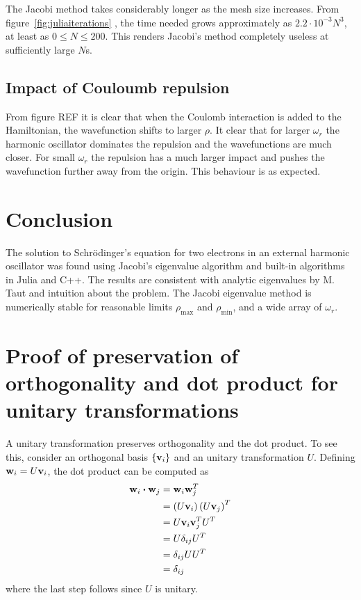 \documentclass[aps,reprint]{revtex4-1}
\newcommand\blankpage{%
  \null
  \thispagestyle{empty}%
  \addtocounter{page}{-1}%
  \newpage}
\begin{document}
The Jacobi method takes considerably longer as the mesh size increases. From
figure~\ref{fig:juliaiterations} , the time needed grows approximately as
\(2.2\cdot 10^{-3}N^{3}\), at least as \(0\leq N \leq 200\). This renders
Jacobi's method completely useless at sufficiently large \(N\)s.

\subsection{Impact of Couloumb repulsion}
From figure REF it is clear that when the Coulomb interaction is added to the
Hamiltonian, the wavefunction shifts to larger $\rho$.
It clear that for larger $\omega_r$ the harmonic oscillator dominates the repulsion
and the wavefunctions are much closer. For small $\omega_r$ the repulsion
has a much larger impact and pushes the wavefunction further away from the origin.
This behaviour is as expected.
\label{sec:discussion}
\section{Conclusion}
The solution to Schrödinger's equation for two electrons in an external
harmonic oscillator was found using Jacobi's eigenvalue algorithm and built-in
algorithms in Julia and C++. The results are consistent with analytic eigenvalues
by M. Taut and intuition about the problem. The Jacobi eigenvalue method is
numerically stable for reasonable limits $\rho_\text{max}$ and $\rho_\text{min}$,
and a wide array of $\omega_r$.
\label{sec:conclusion}

\blankpage
\appendix
\section{Proof of preservation of orthogonality and dot product for unitary transformations}
A unitary transformation preserves orthogonality and the dot product. To see
this, consider an orthogonal basis \(\{\vb{v}_{i}\}\) and an unitary
transformation \(U\). Defining \(\vb{w}_{i}=U\vb{v}_{i}\), the dot product can
be computed as
\begin{align*}
  \vb{w}_{i}\vdot \vb{w}_{j} &= \vb{w}_{i}\vb{w}_{j}^{T}\\
                             &= \left( U\vb{v}_{i} \right)\left( U\vb{v}_{j} \right)^{T}\\
                             &= U\vb{v}_{i}\vb{v}_{j}^{T}U^{T}\\
                             &= U\delta_{ij}U^{T}\\
                             &= \delta_{ij}UU^{T}\\
                             &= \delta_{ij}
\end{align*}
where the last step follows since \(U\) is unitary.
\blankpage
\end{document}
